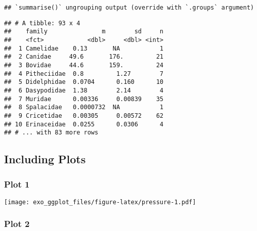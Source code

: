 \documentclass[
]{article}
\newenvironment{Shaded}{\begin{snugshade}}{\end{snugshade}}
\newcommand{\DataTypeTok}[1]{\textcolor[rgb]{0.13,0.29,0.53}{#1}}
\newcommand{\KeywordTok}[1]{\textcolor[rgb]{0.13,0.29,0.53}{\textbf{#1}}}
\newcommand{\NormalTok}[1]{#1}
\newcommand{\OperatorTok}[1]{\textcolor[rgb]{0.81,0.36,0.00}{\textbf{#1}}}
\newcommand{\StringTok}[1]{\textcolor[rgb]{0.31,0.60,0.02}{#1}}
\begin{document}
\begin{Shaded}
\end{Shaded}

\begin{verbatim}
## `summarise()` ungrouping output (override with `.groups` argument)
\end{verbatim}

\begin{verbatim}
## # A tibble: 93 x 4
##    family               m        sd     n
##    <fct>            <dbl>     <dbl> <int>
##  1 Camelidae    0.13       NA           1
##  2 Canidae     49.6       176.         21
##  3 Bovidae     44.6       159.         24
##  4 Pitheciidae  0.8         1.27        7
##  5 Didelphidae  0.0704      0.160      10
##  6 Dasypodidae  1.38        2.14        4
##  7 Muridae      0.00336     0.00839    35
##  8 Spalacidae   0.0000732  NA           1
##  9 Cricetidae   0.00305     0.00572    62
## 10 Erinaceidae  0.0255      0.0306      4
## # ... with 83 more rows
\end{verbatim}

\hypertarget{including-plots}{%
\subsection{Including Plots}\label{including-plots}}

\hypertarget{plot-1}{%
\subsubsection{Plot 1}\label{plot-1}}

\texttt{[image: exo\_ggplot\_files/figure-latex/pressure-1.pdf]}

\hypertarget{plot-2}{%
\subsubsection{Plot 2}\label{plot-2}}
\end{document}
